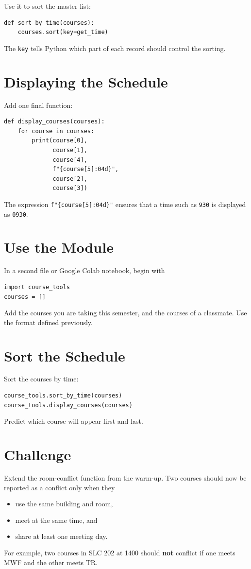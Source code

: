 \documentclass{article}
\begin{document}
Use it to sort the master list:

\begin{verbatim}
def sort_by_time(courses):
    courses.sort(key=get_time)
\end{verbatim}

The \texttt{key} tells Python which part of each record should control the sorting.

\section{Displaying the Schedule}

Add one final function:

\begin{verbatim}
def display_courses(courses):
    for course in courses:
        print(course[0],
              course[1],
              course[4],
              f"{course[5]:04d}",
              course[2],
              course[3])
\end{verbatim}

The expression \verb+f"{course[5]:04d}"+ ensures that a time such as \texttt{930} is displayed as \texttt{0930}.

\section{Use the Module}

In a second file or Google Colab notebook, begin with

\begin{verbatim}
import course_tools
courses = []
\end{verbatim}

Add the courses you are taking this semester, and the courses of a classmate.  Use the format defined previously.

\section{Sort the Schedule}

Sort the courses by time:

\begin{verbatim}
course_tools.sort_by_time(courses)
course_tools.display_courses(courses)
\end{verbatim}

Predict which course will appear first and last.

\section{Challenge}

Extend the room-conflict function from the warm-up. Two courses should now be reported as a conflict only when they

\begin{itemize}
\item use the same building and room,
\item meet at the same time, and
\item share at least one meeting day.
\end{itemize}

For example, two courses in SLC 202 at 1400 should \textbf{not} conflict if one meets MWF and the other meets TR.
\end{document}

